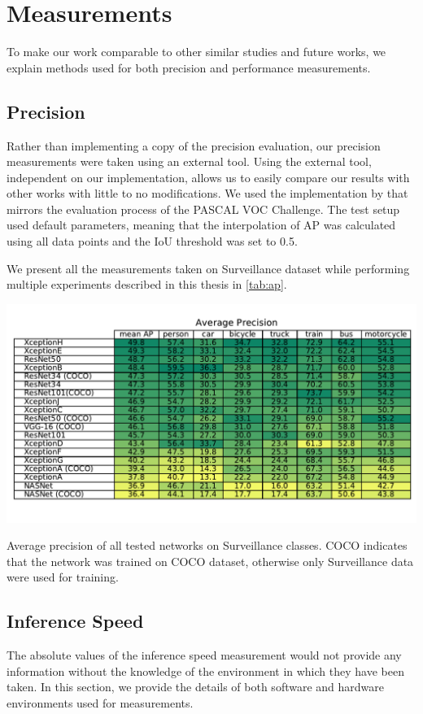 \section{Measurements}
To make our work comparable to other similar studies and future works, we explain methods used for both precision and performance measurements.

\subsection{Precision}
Rather than implementing a copy of the precision evaluation, our precision measurements were taken using an external tool. Using the external tool, independent on our implementation, allows us to easily compare our results with other works with little to no modifications. We used the implementation by \citet{bib:metricsgit} that mirrors the evaluation process of the PASCAL VOC Challenge. The test setup used default parameters, meaning that the interpolation of AP was calculated using all data points and the IoU threshold was set to 0.5. 

We present all the measurements taken on Surveillance dataset while performing multiple experiments described in this thesis in \cref{tab:ap}.


\begin{table}
    \centering
    \includegraphics[width=\textwidth]{img/ap}
    \caption[Average precision of all tested networks on Surveillance classes]{Average precision of all tested networks on Surveillance classes. COCO indicates that the network was trained on COCO dataset, otherwise only Surveillance data were used for training.} 
    \label{tab:ap}
\end{table}

\subsection{Inference Speed}
The absolute values of the inference speed measurement would not provide any information without the knowledge of the environment in which they have been taken. In this section, we provide the details of both software and hardware environments used for measurements.

